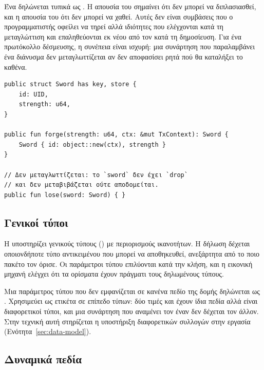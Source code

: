 Ένα  δηλώνεται τυπικά ως . Η απουσία του  σημαίνει
ότι δεν μπορεί να διπλασιασθεί, και η απουσία του  ότι δεν μπορεί να χαθεί.
Αυτές δεν είναι συμβάσεις που ο προγραμματιστής οφείλει να τηρεί αλλά ιδιότητες που
ελέγχονται κατά τη μεταγλώττιση και επαληθεύονται εκ νέου από τον 
κατά τη δημοσίευση. Για ένα πρωτόκολλο δέσμευσης, η συνέπεια είναι ισχυρή: μια συνάρτηση
που παραλαμβάνει ένα διάνυσμα  δεν μεταγλωττίζεται αν δεν αποφασίσει ρητά πού θα
καταλήξει το καθένα.

\begin{lstlisting}[language=Move,caption={Ένα αντικείμενο με ικανότητες \code{key} και \code{store}},label={lst:abilities}]
public struct Sword has key, store {
    id: UID,
    strength: u64,
}

public fun forge(strength: u64, ctx: &mut TxContext): Sword {
    Sword { id: object::new(ctx), strength }
}

// Δεν μεταγλωττίζεται: το `sword` δεν έχει `drop`
// και δεν μεταβιβάζεται ούτε αποδομείται.
public fun lose(sword: Sword) { }
\end{lstlisting}

\subsection{Γενικοί τύποι}
\label{sec:generics}

Η  υποστηρίζει γενικούς τύπους () με περιορισμούς ικανοτήτων. Η
δήλωση  δέχεται οποιονδήποτε τύπο αντικειμένου που
μπορεί να αποθηκευθεί, ανεξάρτητα από το ποιο πακέτο τον όρισε. Οι παράμετροι τύπου
επιλύονται κατά την κλήση, και η εικονική μηχανή ελέγχει ότι τα ορίσματα έχουν πράγματι
τους δηλωμένους τύπους.

Μια παράμετρος τύπου που δεν εμφανίζεται σε κανένα πεδίο της δομής δηλώνεται ως
. Χρησιμεύει ως ετικέτα σε επίπεδο τύπων: δύο τιμές
 και  έχουν ίδια πεδία αλλά είναι
διαφορετικοί τύποι, και μια συνάρτηση που αναμένει τον έναν δεν δέχεται τον άλλον. Στην
τεχνική αυτή στηρίζεται η υποστήριξη διαφορετικών συλλογών στην εργασία
(Ενότητα~\ref{sec:data-model}).

\subsection{Δυναμικά πεδία}
\label{sec:dynamic-fields}

